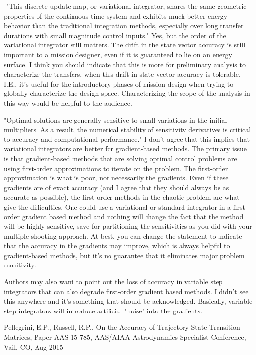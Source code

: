 \documentclass[11pt]{article}
\begin{document}
\begin{enumerate}
-"This discrete update map, or variational integrator, shares the same geometric properties of the continuous time system and exhibits much better energy behavior than the traditional integration methods, especially over long transfer durations with small magnitude control inputs."  Yes, but the order of the variational integrator still matters.  The drift in the state vector accuracy is still important to a mission designer, even if it is guaranteed to lie on an energy surface.  I think you should indicate that this is more for preliminary analysis to characterize the transfers, when this drift in state vector accuracy is tolerable.  I.E., it's useful for the introductory phases of mission design when trying to globally characterize the design space.  Characterizing the scope of the analysis in this way would be helpful to the audience.

"Optimal solutions are generally sensitive to small variations in the initial multipliers. As a result, the numerical stability of sensitivity derivatives is critical to accuracy and computational performance."  I don't agree that this implies that variational integrators are better for gradient-based methods.  The primary issue is that gradient-based methods that are solving optimal control problems are using first-order approximations to iterate on the problem.  The first-order approximation is what is poor, not necessarily the gradients.  Even if these gradients are of exact accuracy (and I agree that they should always be as accurate as possible), the first-order methods in the chaotic problem are what give the difficulties.  One could use a variational or standard integrator in a first-order gradient based method and nothing will change the fact that the method will be highly sensitive, save for partitioning the sensitivities as you did with your multiple shooting approach.  At best, you can change the statement to indicate that the accuracy in the gradients may improve, which is always helpful to gradient-based methods, but it's no guarantee that it eliminates major problem sensitivity.

Authors may also want to point out the loss of accuracy in variable step integrators that can also degrade first-order gradient based methods.  I didn't see this anywhere and it's something that should be acknowledged.  Basically, variable step integrators will introduce artificial "noise" into the gradients:

Pellegrini, E.P., Russell, R.P., On the Accuracy of Trajectory State Transition Matrices, Paper AAS-15-785, AAS/AIAA Astrodynamics Specialist Conference, Vail, CO, Aug 2015


\end{enumerate}
\end{document}
